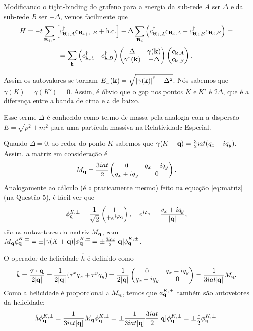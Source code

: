 \documentclass[a4paper,10pt]{article}
\begin{document}
Modificando o tight-binding do grafeno para a energia da sub-rede $A$ ser $\Delta$ e da sub-rede $B$ ser $-\Delta$, vemos facilmente que
$$
H = -t \sum_{\vb{R}_i, \nu} \qty[c_{\vb{R}_i, A}^\dagger c_{\vb{R}_{i+\nu}, B} + \text{h.c.}] +
\Delta \sum_{\vb{R}_i} \qty(c_{\vb{R}_i, A}^\dagger c_{\vb{R}_i, A} - c_{\vb{R}_i, B}^\dagger c_{\vb{R}_i, B}) =
$$
$$
= \sum_{\vb{k}}
\begin{pmatrix}
c_{\vb{k},A}^\dagger & c_{\vb{k},B}^\dagger
\end{pmatrix}
\begin{pmatrix}
\Delta & \gamma(\vb{k}) \\
\gamma^*(\vb{k}) & -\Delta
\end{pmatrix}
\begin{pmatrix}
c_{\vb{k},A} \\ c_{\vb{k},B}
\end{pmatrix}.
$$

Assim os autovalores se tornam $E_\pm(\vb{k}) = \sqrt{\abs{\gamma(\vb{k})}^2 + \Delta^2}$. Nós sabemos que $\gamma(K) = \gamma(K') = 0$. Assim, é óbvio que o gap nos pontos $K$ e $K'$ é $2\Delta$, que é a diferença entre a banda de cima e a de baixo.

Esse termo $\Delta$ é conhecido como termo de massa pela analogia com a dispersão $E = \sqrt{p^2 + m^2}$ para uma partícula massiva na Relatividade Especial.

Quando $\Delta = 0$, ao redor do ponto $K$ sabemos que $\gamma(K + \vb{q}) = \frac{3}{2} i at (q_x - iq_y)$. Assim, a matriz em consideração é
$$
M_{\vb{q}} =
\frac{3i at}{2}
\begin{pmatrix}
0 & q_x - iq_y \\
q_x + i q_y & 0
\end{pmatrix}.
$$
Analogamente ao cálculo (é o praticamente mesmo) feito na equação \ref{eq:matriz} (na Questão 5), é fácil ver que
$$
\phi_{\vb{q}}^{K, \pm} = \frac{1}{\sqrt{2}}
\begin{pmatrix}
1 \\ \pm e^{i\varphi_{\vb{q}}}
\end{pmatrix},
\quad e^{i\varphi_{\vb{q}}} = \frac{q_x + i q_y}{\abs{\vb{q}}},
$$
são os autovetores da matriz $M_{\vb{q}}$, com $M_{\vb{q}} \phi_{\vb{q}}^{K, \pm} = \pm \abs{\gamma(K+\vb{q})} \phi_{\vb{q}}^{K, \pm} = \pm \frac{3iat}{2} \abs{\vb{q}} \phi_{\vb{q}}^{K, \pm}$.

O operador de helicidade $\hat{h}$ é definido como
$$
\hat{h} = \frac{\bm{\tau} \vdot \q}{2 \abs{\q}} = \frac{1}{2\abs{\q}}
(\tau^x q_x + \tau^y q_y) =
\frac{1}{2\abs{\q}}
\begin{pmatrix}
0 & q_x - i q_y \\
q_x + iq_y & 0
\end{pmatrix} = \frac{1}{3iat \abs{\q}} M_{\q}.
$$
Como a helicidade é proporcional a $M_{\vb{q}}$, temos que $\phi_{\vb{q}}^{K, \pm}$ também são autovetores da helicidade:
$$
\hat{h} \phi_{\vb{q}}^{K, \pm} = \frac{1}{3iat\abs{\vb{q}}} M_{\vb{q}} \phi_{\vb{q}}^{K, \pm} =
\pm \frac{1}{3iat\abs{\vb{q}}} \frac{3iat}{2} \abs{\vb{q}} \phi_{\vb{q}}^{K, \pm} = \pm \frac{1}{2} \phi_{\vb{q}}^{K, \pm}.
$$
\end{document}
